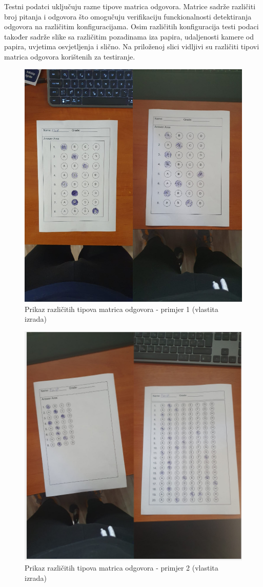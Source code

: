 \documentclass{foi}
\begin{document}
Testni podatci uključuju razne tipove matrica odgovora. Matrice sadrže različiti broj pitanja i odgovora što omogučuju verifikaciju funckionalnosti detektiranja odgovora na različitim konfiguracijama. Osim različitih konfiguracija testi podaci također sadrže slike sa različitim pozadinama iza papira, udaljenosti kamere od papira, uvjetima osvjetljenja i slično. Na priloženoj slici vidljivi su različiti tipovi matrica odgovora korištenih za testiranje.

\begin{figure}[H]
\centering
\includegraphics[width=0.8\linewidth]{slike/Test1.png}
\caption{Prikaz različitih tipova matrica odgovora - primjer 1 (vlastita izrada)}
\end{figure}

\begin{figure}[H]
\centering
\includegraphics[width=0.8\linewidth]{slike/Test2.png}
\caption{Prikaz različitih tipova matrica odgovora - primjer 2 (vlastita izrada)}
\end{figure}
\end{document}
